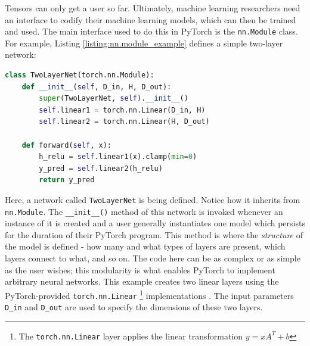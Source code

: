 \documentclass[12pt,letterpaper]{article}
\begin{document}
%
%

\label{sec:models_in_pytorch}
Tensors can only get a user so far. Ultimately, machine learning researchers need an interface to codify their machine learning models, which can then be trained and used. The main interface used to do this in PyTorch is the \texttt{nn.Module} class. For example, Listing \ref{listing:nn.module_example} defines a simple two-layer network:
\begin{lstlisting}[language=Python, caption={Definition of a simple two-layer neural network from the PyTorch documentation \cite{pytorch_tutorial}}, label={listing:nn.module_example}]
class TwoLayerNet(torch.nn.Module):
    def __init__(self, D_in, H, D_out):
        super(TwoLayerNet, self).__init__()
        self.linear1 = torch.nn.Linear(D_in, H)
        self.linear2 = torch.nn.Linear(H, D_out)

    def forward(self, x):
        h_relu = self.linear1(x).clamp(min=0)
        y_pred = self.linear2(h_relu)
        return y_pred
\end{lstlisting}
Here, a network called \texttt{TwoLayerNet} is being defined. Notice how it inherits from \texttt{nn.Module}. The \texttt{\_\_init\_\_()} method of this network is invoked whenever an instance of it is created and a user generally instantiates one model which persists for the duration of their PyTorch program. This method is where the \textit{structure} of the model is defined - how many and what types of layers are present, which layers connect to what, and so on. The code here can be as complex or as simple as the user wishes; this modularity is what enables PyTorch to implement arbitrary neural networks. This example creates two linear layers using the PyTorch-provided \texttt{torch.nn.Linear} \footnote{The \texttt{torch.nn.Linear} layer applies the linear transformation $y=xA^T + b$} implementations \cite{pytorch_docs}. The input parameters \texttt{D\_in} and \texttt{D\_out} are used to specify the dimensions of these two layers.
\par 
\end{document}
